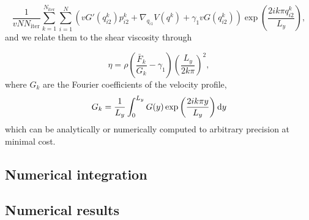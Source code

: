 \begin{equation}
    \label{eq:norton_fourier_estimator}
    \frac{1}{vN N_{\mathrm{iter}}}\sum_{k=1}^{N_{\mathrm{iter}}}\sum_{i=1}^N\left(vG'\left(q_{i2}^k\right)p_{i2}^k+\nabla_{q_{i1}}V(q^k)+\gamma_1vG\left(q_{i2}^k\right)\right)\exp\left(\frac{2ik\pi q_{i2}^k}{L_y}\right),
\end{equation}
and we relate them to the shear viscosity through

\begin{equation}
    \label{eq:norton_shear_viscosity_estimator}
    \eta=\rho\left(\frac{\bar F_k}{G_k} -\gamma_1\right)\left(\frac{L_y}{2k\pi}\right)^2,
\end{equation}
where $G_k$ are the Fourier coefficients of the velocity profile,
\[G_k=\frac{1}{L_y}\int_0^{L_y} G(y)\exp\left(\frac{2ik\pi y}{L_y}\right)\mathrm{d} y\]
which can be analytically or numerically computed to arbitrary precision at minimal cost.
\subsection{Numerical integration}
\subsection{Numerical results}

